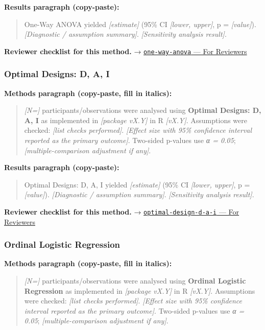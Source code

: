 \documentclass[
]{article}
\begin{document}
\textbf{Results paragraph (copy-paste):}

\begin{quote}
One-Way ANOVA yielded \emph{{[}estimate{]}} (95\% CI \emph{{[}lower,
upper{]}}, p = \emph{{[}value{]}}). \emph{{[}Diagnostic / assumption
summary{]}}. \emph{{[}Sensitivity analysis result{]}}.
\end{quote}

\textbf{Reviewer checklist for this method.} →
\href{../chapters/04-inferential/one-way-anova.Rmd\#for-reviewers}{\texttt{one-way-anova}
--- For Reviewers}

\subsubsection{Optimal Designs: D, A, I}\label{optimal-designs-d-a-i}

\textbf{Methods paragraph (copy-paste, fill in italics):}

\begin{quote}
\emph{{[}N={]}} participants/observations were analysed using
\textbf{Optimal Designs: D, A, I} as implemented in \emph{{[}package
vX.Y{]}} in R \emph{{[}vX.Y{]}}. Assumptions were checked: \emph{{[}list
checks performed{]}}. \emph{{[}Effect size with 95\% confidence interval
reported as the primary outcome{]}}. Two-sided p-values use \emph{α =
0.05}; \emph{{[}multiple-comparison adjustment if any{]}}.
\end{quote}

\textbf{Results paragraph (copy-paste):}

\begin{quote}
Optimal Designs: D, A, I yielded \emph{{[}estimate{]}} (95\% CI
\emph{{[}lower, upper{]}}, p = \emph{{[}value{]}}). \emph{{[}Diagnostic
/ assumption summary{]}}. \emph{{[}Sensitivity analysis result{]}}.
\end{quote}

\textbf{Reviewer checklist for this method.} →
\href{../chapters/16-design/optimal-design-d-a-i.Rmd\#for-reviewers}{\texttt{optimal-design-d-a-i}
--- For Reviewers}

\subsubsection{Ordinal Logistic
Regression}\label{ordinal-logistic-regression}

\textbf{Methods paragraph (copy-paste, fill in italics):}

\begin{quote}
\emph{{[}N={]}} participants/observations were analysed using
\textbf{Ordinal Logistic Regression} as implemented in \emph{{[}package
vX.Y{]}} in R \emph{{[}vX.Y{]}}. Assumptions were checked: \emph{{[}list
checks performed{]}}. \emph{{[}Effect size with 95\% confidence interval
reported as the primary outcome{]}}. Two-sided p-values use \emph{α =
0.05}; \emph{{[}multiple-comparison adjustment if any{]}}.
\end{quote}
\end{document}
